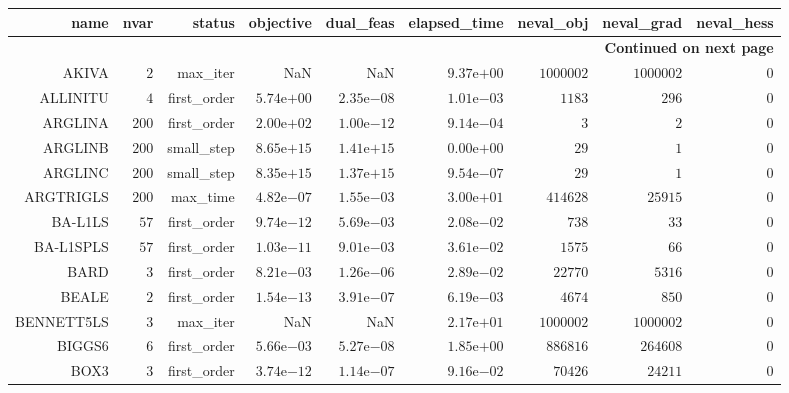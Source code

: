 \begin{longtable}{rrrrrrrrr}
\hline
name & nvar & status & objective & dual\_feas & elapsed\_time & neval\_obj & neval\_grad & neval\_hess \\\hline
\endhead
\hline
\multicolumn{9}{r}{{\bfseries Continued on next page}}\\
\hline
\endfoot
\endlastfoot
AKIVA & \(     2\) & max\_iter &       NaN &       NaN & \( 9.37\)e\(+00\) & \(1000002\) & \(1000002\) & \(     0\) \\
ALLINITU & \(     4\) & first\_order & \( 5.74\)e\(+00\) & \( 2.35\)e\(-08\) & \( 1.01\)e\(-03\) & \(  1183\) & \(   296\) & \(     0\) \\
ARGLINA & \(   200\) & first\_order & \( 2.00\)e\(+02\) & \( 1.00\)e\(-12\) & \( 9.14\)e\(-04\) & \(     3\) & \(     2\) & \(     0\) \\
ARGLINB & \(   200\) & small\_step & \( 8.65\)e\(+15\) & \( 1.41\)e\(+15\) & \( 0.00\)e\(+00\) & \(    29\) & \(     1\) & \(     0\) \\
ARGLINC & \(   200\) & small\_step & \( 8.35\)e\(+15\) & \( 1.37\)e\(+15\) & \( 9.54\)e\(-07\) & \(    29\) & \(     1\) & \(     0\) \\
ARGTRIGLS & \(   200\) & max\_time & \( 4.82\)e\(-07\) & \( 1.55\)e\(-03\) & \( 3.00\)e\(+01\) & \(414628\) & \( 25915\) & \(     0\) \\
BA-L1LS & \(    57\) & first\_order & \( 9.74\)e\(-12\) & \( 5.69\)e\(-03\) & \( 2.08\)e\(-02\) & \(   738\) & \(    33\) & \(     0\) \\
BA-L1SPLS & \(    57\) & first\_order & \( 1.03\)e\(-11\) & \( 9.01\)e\(-03\) & \( 3.61\)e\(-02\) & \(  1575\) & \(    66\) & \(     0\) \\
BARD & \(     3\) & first\_order & \( 8.21\)e\(-03\) & \( 1.26\)e\(-06\) & \( 2.89\)e\(-02\) & \( 22770\) & \(  5316\) & \(     0\) \\
BEALE & \(     2\) & first\_order & \( 1.54\)e\(-13\) & \( 3.91\)e\(-07\) & \( 6.19\)e\(-03\) & \(  4674\) & \(   850\) & \(     0\) \\
BENNETT5LS & \(     3\) & max\_iter &       NaN &       NaN & \( 2.17\)e\(+01\) & \(1000002\) & \(1000002\) & \(     0\) \\
BIGGS6 & \(     6\) & first\_order & \( 5.66\)e\(-03\) & \( 5.27\)e\(-08\) & \( 1.85\)e\(+00\) & \(886816\) & \(264608\) & \(     0\) \\
BOX3 & \(     3\) & first\_order & \( 3.74\)e\(-12\) & \( 1.14\)e\(-07\) & \( 9.16\)e\(-02\) & \( 70426\) & \( 24211\) & \(     0\) \\

\end{longtable}
